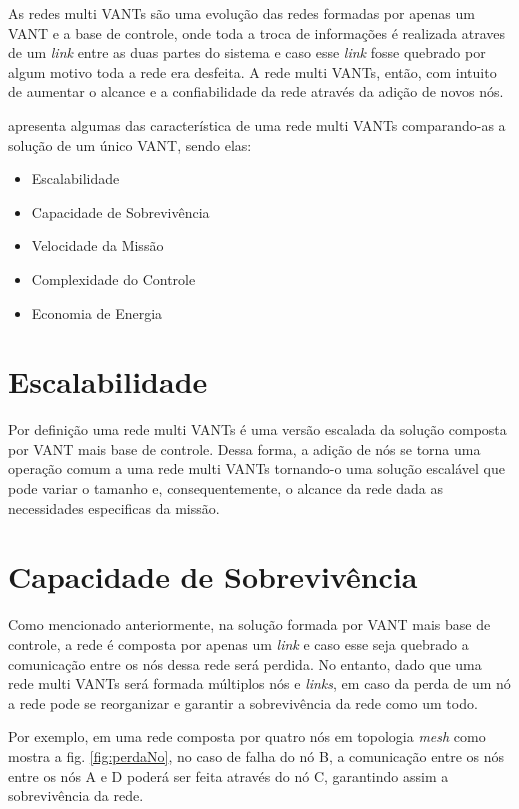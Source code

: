 As redes multi VANTs são uma evolução das redes formadas por apenas um VANT e a base de controle, onde toda a troca de informações é realizada atraves de um \emph{link} entre as duas partes do sistema e caso esse \emph{link} fosse quebrado por algum motivo toda a rede era desfeita. A rede multi VANTs, então, com intuito de aumentar o alcance e a confiabilidade da rede através da adição de novos nós.

\cite{gupta2015survey} apresenta algumas das característica de uma rede multi VANTs comparando-as a solução de um único VANT, sendo elas:
\begin{itemize}
\item Escalabilidade
\item Capacidade de Sobrevivência
\item Velocidade da Missão
\item Complexidade do Controle
\item Economia de Energia
\end{itemize} 

\section{Escalabilidade}

Por definição uma rede multi VANTs é uma versão escalada da solução composta por VANT mais base de controle. Dessa forma, a adição de nós se torna uma operação comum a uma rede multi VANTs tornando-o uma solução escalável que pode variar o tamanho e, consequentemente, o alcance da rede dada as necessidades especificas da missão.

\section{Capacidade de Sobrevivência}

Como mencionado anteriormente, na solução formada por VANT mais base de controle, a rede é composta por apenas um \emph{link} e caso esse seja quebrado a comunicação entre os nós dessa rede será perdida. No entanto, dado que uma rede multi VANTs será formada múltiplos nós e \emph{links}, em caso da perda de um nó a rede pode se reorganizar e garantir a sobrevivência da rede como um todo. 

Por exemplo, em uma rede composta por quatro nós em topologia \emph{mesh} como mostra a fig. \ref{fig:perdaNo}, no caso de falha do nó B, a comunicação entre os nós entre os nós A e D poderá ser feita através do nó C, garantindo assim a sobrevivência da rede. 

